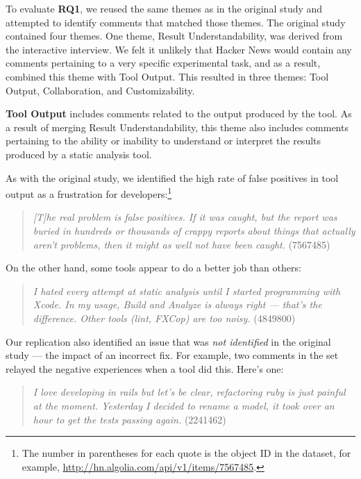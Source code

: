 \documentclass{sig-alternate}
\begin{document}
To evaluate \textbf{RQ1}, we reused the same themes as in the original study and attempted to identify comments that matched those themes. The original study contained four themes. One theme, Result Understandability, was derived from the interactive interview. We felt it unlikely that Hacker News would contain any comments pertaining to a very specific experimental task, and as a result, combined this theme with Tool Output. This resulted in three themes: Tool Output, Collaboration, and Customizability.

\textbf{Tool Output} includes comments related to the output produced by the tool. As a result of merging Result Understandability, this theme also includes comments pertaining to the ability or inability to understand or interpret the results produced by a static analysis tool.

As with the original study, we identified the high rate of false positives in tool output as a frustration for developers:\footnote{The number in parentheses for each quote is the object ID in the dataset, for example, \url{http://hn.algolia.com/api/v1/items/7567485}.}

\begin{quote}
\textit{[T]he real problem is false positives.  If it was caught, but the report was buried in hundreds or thousands of crappy reports about things that actually aren't problems, then it might as well not have been caught.} (7567485)
\end{quote}

On the other hand, some tools appear to do a better job than others:

\begin{quote}
\textit{I hated every attempt at static analysis until I started programming with Xcode. In my usage, Build and Analyze is always right --- that's the difference. Other tools (lint, FXCop) are too noisy.} (4849800)
\end{quote}

Our replication also identified an issue that was \textit{not identified} in the original study --- the impact of an incorrect fix. For example, two comments in the set relayed the negative experiences when a tool did this. Here's one:

\begin{quote}
\textit{I love developing in rails but let's be clear, refactoring ruby is just painful at the moment. Yesterday I decided to rename a model, it took over an hour to get the tests passing again.} (2241462)
\end{quote}
\end{document}

